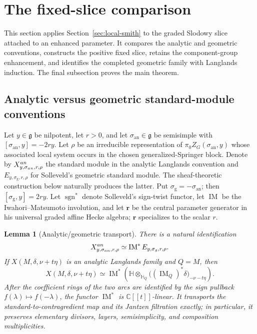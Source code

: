 \documentclass[10pt,a4paper]{amsart}
\newtheorem{lemma}[theorem]{Lemma}
\newcommand{\Hh}{\mathbb H}
\begin{document}
\section{The fixed-slice comparison}
\label{sec:fixed-slice-comparison}

This section applies Section~\ref{sec:local-smith} to the graded Slodowy
slice attached to an enhanced parameter.  It compares the analytic and
geometric conventions, constructs the positive fixed slice, retains the
component-group enhancement, and identifies the completed geometric family
with Langlands induction.  The final subsection proves the main theorem.

\subsection*{Analytic versus geometric standard-module conventions}
Let $y\in\mathfrak g$ be nilpotent, let $r>0$, and let
$\sigma_{\mathrm{an}}\in\mathfrak g$ be semisimple with
$[\sigma_{\mathrm{an}},y]=-2ry$.  Let $\rho$ be an irreducible
representation of $\pi_0Z_G(\sigma_{\mathrm{an}},y)$ whose associated local
system occurs in the chosen generalized-Springer block.  Denote by
$X^{\rm an}_{y,\sigma_{\rm an},r,\rho}$ the standard module in the
analytic Langlands convention and
$E_{y,\sigma_{\mathrm g},r,\rho}$ for Solleveld's geometric standard module.
The sheaf-theoretic construction below naturally produces the latter.  Put
$\sigma_{\mathrm g}=-\sigma_{\mathrm{an}}$; then
$[\sigma_{\mathrm g},y]=2ry$.
Let $\operatorname{sgn}^*$ denote Solleveld's sign-twist functor, let
$\operatorname{IM}$ be the Iwahori--Matsumoto involution, and let $\mathbf r$
be the central parameter generator in his universal graded affine Hecke
algebra; $\mathbf r$ specializes to the scalar $r$.

\begin{lemma}[Analytic/geometric transport]
\label{lem:analytic-geometric-transport}
There is a natural identification
\[
 X^{\rm an}_{y,\sigma_{\rm an},r,\rho}
 \simeq \operatorname{IM}^{*}E_{y,\sigma_{\rm g},r,\rho}.
\]
If $X(M,\delta,\nu+t\eta)$ is an analytic Langlands family
and $Q=M$, then
\[
 X(M,\delta,\nu+t\eta)\simeq
 \operatorname{IM}^*\!\left(
  \Hh\otimes_{\Hh_Q}
  \bigl((\operatorname{IM}_Q)^*\delta\bigr)_{-\nu-t\eta}
 \right).
\]
After the coefficient rings of the two arcs are identified by the sign
pullback $f(\lambda)\mapsto f(-\lambda)$, the functor
$\operatorname{IM}^*$ is $\mathbb C[[t]]$-linear.  It transports the
standard-to-contragredient map and its Jantzen filtration exactly; in
particular, it preserves elementary divisors, layers, semisimplicity, and
composition multiplicities.
\end{lemma}
\end{document}
